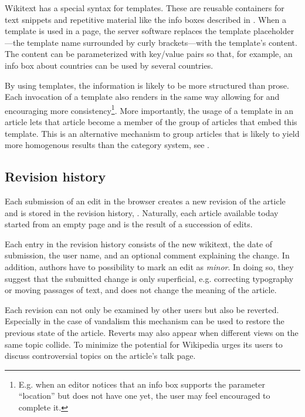 Wikitext has a special syntax for templates. 
These are reusable containers for text snippets and repetitive material like the info boxes described in .
When a template is used in a page, the server software replaces the template placeholder---the template name surrounded by curly brackets---with the template's content.
The content can be parameterized with key/value pairs so that, for example, an info box about countries can be used by several countries.

By using templates, the information is likely to be more structured than prose.
Each invocation of a template also renders in the same way allowing for and encouraging more consistency\footnote{E.g. when an editor notices that an info box supports the parameter ``location'' but does not have one yet, the user may feel encouraged to complete it.}.
More importantly, the usage of a template in an article lets that article become a member of the group of articles that embed this template.
This is an alternative mechanism to group articles that is likely to yield more homogenous results than the category system, see .

\subsection{Revision history}\label{sub:revisionhistory}

Each submission of an edit in the browser creates a new revision of the article and is stored in the revision history, .
Naturally, each article available today started from an empty page and is the result of a succession of edits.


Each entry in the revision history consists of the new wikitext, the date of submission, the user name, and an optional comment explaining the change.
In addition, authors have to possibility to mark an edit as \emph{minor}.
In doing so, they suggest that the submitted change is only superficial, e.g. correcting typography or moving passages of text, and does not change the meaning of the article.\cite{wpminor}

Each revision can not only be examined by other users but also be reverted. 
Especially in the case of vandalism this mechanism can be used to restore the previous state of the article.
Reverts may also appear when different views on the same topic collide.
To minimize the potential for \cite{suh2007us} Wikipedia urges its users to discuss controversial topics on the article's talk page.


